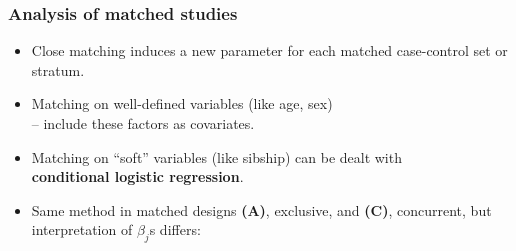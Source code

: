\documentclass[12pt,dvipsnames,t,handout%
,aspectratio=169%
]{beamer}
\begin{document}
\begin{frame}
\frametitle{Analysis of matched studies}

\begin{itemize}
\item Close matching induces a new 
parameter for each matched case-control set or stratum.
\pause
{}
\pause 
\item Matching on well-defined variables (like age, sex) \\ -- 
include these factors as covariates.
\pause
\medskip
\item Matching  on ``soft'' variables (like sibship) %
can be dealt with \\
{\bf conditional logistic regression}.
\pause
\medskip
\item Same method in matched designs {\bf (A)}, exclusive, and {\bf (C)}, concurrent, but interpretation of %
$\beta_j$s differs:
\medskip
{} 
\end{itemize}

\end{frame}
\end{document}
